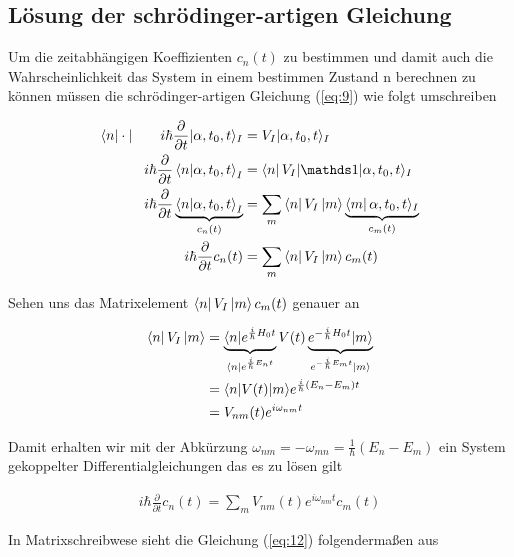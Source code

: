 \subsection*{Lösung der schrödinger-artigen Gleichung}

Um die zeitabhängigen Koeffizienten \(c_n(t)\) zu bestimmen und damit auch die Wahrscheinlichkeit das System in einem bestimmen Zustand n berechnen zu können müssen die schrödinger-artigen Gleichung (\ref{eq:9}) wie folgt umschreiben

\begin{align}
  \label{eq:10}
  \bra{n}\cdot|\qquad  i\hbar \frac{\partial}{\partial t}|\alpha,t_0,t\rangle_I &= V_I|\alpha,t_0,t\rangle_I \notag \\
 i\hbar \frac{\partial}{\partial t}\braket{n}{\alpha,t_0,t}_I &= \bra{n}V_I|\mathds 1|\alpha,t_0,t\rangle_I \notag \\
i\hbar \frac{\partial}{\partial t}\underbr{\braket{n}{\alpha,t_0,t}_I}_{c_n(t)} &= \sum_m\bra{n}V_I \ket{m}\underbr{\bra{m}\alpha,t_0,t\rangle_I}_{c_m(t)} \notag \\
i\hbar \frac{\partial}{\partial t}c_n(t) &= \sum_m\bra{n}V_I \ket{m}c_m(t) 
\end{align}

Sehen uns das Matrixelement \(\left\langle n \right|V_I \left| m \right\rangle c_m(t) \) genauer an

\begin{align}
  \label{eq:11}
  \left\langle n \right|V_I \left| m \right\rangle &=  \underbrace{\langle n | e^{\frac{i}{\hbar}H_0t}}_{\langle n|e^{\frac{i}{\hbar}E_nt}}V(t)\underbrace{e^{-\frac{i}{\hbar}H_0t}|m\rangle}_{e^{-\frac{i}{\hbar}E_mt}|m\rangle } \notag\\
& = \langle n|V(t)|m\rangle e^{\frac{i}{\hbar}(E_n-E_m)t} \notag \\
&= V_{nm}(t) e^{i\omega_{nm} t}
\end{align}

Damit erhalten wir mit der Abkürzung \(\omega_{nm} = - \omega_{mn} = \frac{1}{\hbar}(E_n - E_m)\) ein System gekoppelter Differentialgleichungen das es zu lösen gilt

\begin{align}
  \label{eq:12}
  \boxed{i\hbar \frac{\partial}{\partial t}c_n(t) = \sum_m V_{nm}(t) e^{i\omega_{nm}t}c_m(t)}
\end{align}

In Matrixschreibwese sieht die Gleichung (\ref{eq:12}) folgendermaßen aus

